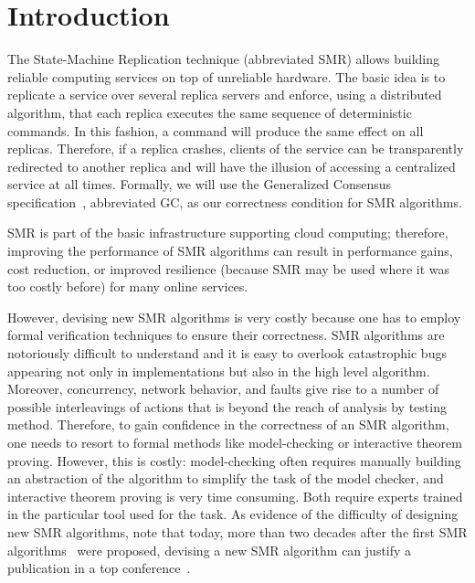 \section{Introduction}

The State-Machine Replication technique (abbreviated SMR) allows building
reliable computing services on top of unreliable hardware. The basic idea
is to replicate a service over several replica servers and enforce, using
a distributed algorithm, that each replica executes the same sequence of
deterministic commands. In this fashion, a command will produce the same effect
on all replicas. Therefore, if a replica crashes, clients of the service can
be transparently redirected to another replica and will have the illusion
of accessing a centralized service at all times. Formally, we will use the
Generalized Consensus specification~\cite{Lamport05GeneralizeConsensus},
abbreviated GC, as our correctness condition for SMR algorithms.

SMR is part of the basic infrastructure supporting cloud computing; therefore,
improving the performance of SMR algorithms can result in performance gains,
cost reduction, or improved resilience (because SMR may be used where it was
too costly before) for many online services.

However, devising new SMR algorithms is very costly because one has to employ
formal verification techniques to ensure their correctness. SMR algorithms are
notoriously difficult to understand and it is easy to overlook catastrophic bugs
appearing not only in implementations but also in the high level algorithm.
Moreover, concurrency, network behavior, and faults give rise to a number
of possible interleavings of actions that is beyond the reach of analysis
by testing method. Therefore, to gain confidence in the correctness of an
SMR algorithm, one needs to resort to formal methods like model-checking or
interactive theorem proving. However, this is costly: model-checking often
requires manually building an abstraction of the algorithm to simplify the task
of the model checker, and interactive theorem proving is very time consuming.
Both require experts trained in the particular tool used for the task. As
evidence of the difficulty of designing new SMR algorithms, note that today,
more than two decades after the first SMR algorithms~\cite{Lamport98ParttimeParliament,BirmanJoseph87ReliableCommunicationPresenceFailures,OkiLiskov88ViewstampedReplicationGeneralPrimaryCopy,DworkLynchStockmeyer84ConsensusPresencePartialSynchronyPreliminaryVersion} 
were proposed, devising a new SMR algorithm can justify a publication in a top
conference~\cite{MoraruAndersenKaminsky13ThereIsMoreConsensusEgalitarianParliaments,OngaroOusterhout14SearchUnderstandableConsensusAlgorithm}.

